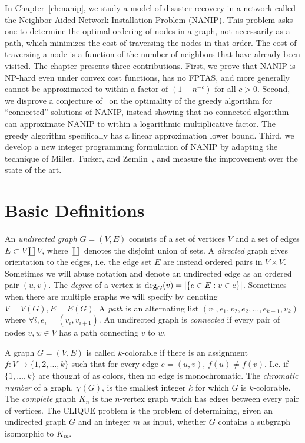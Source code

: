 In Chapter~\ref{ch:nanip}, we study a model of disaster recovery in a network
called the Neighbor Aided Network Installation Problem (NANIP). This problem
asks one to determine the optimal ordering of nodes in a graph, not necessarily
as a path, which minimizes the cost of traversing the nodes in that order. The
cost of traversing a node is a function of the number of neighbors that have
already been visited. The chapter presents three contributions. First, we prove
that NANIP is NP-hard even under convex cost functions, has no FPTAS, and more
generally cannot be approximated to within a factor of $(1-n^{-c})$ for all
$c>0$. Second, we disprove a conjecture of~\cite{Gutfraind14} on the optimality
of the greedy algorithm for ``connected'' solutions of NANIP, instead showing
that no connected algorithm can approximate NANIP to within a logarithmic
multiplicative factor. The greedy algorithm specifically has a linear
approximation lower bound. Third, we develop a new integer programming
formulation of NANIP by adapting the technique of Miller, Tucker, and
Zemlin~\cite{miller1960integer}, and measure the improvement over the state of
the art.~\cite{Gutfraind14}
 
\section{Basic Definitions}

An \emph{undirected graph} $G = (V,E)$ consists of a set of vertices $V$ and a
set of edges $E \subset V \coprod V$, where $\coprod$ denotes the disjoint
union of sets. A \emph{directed} graph gives orientation to the edges, i.e. the
edge set $E$ are instead ordered pairs in $V \times V$. Sometimes we will abuse
notation and denote an undirected edge as an ordered pair $(u,v)$. The
\emph{degree} of a vertex is $\textup{deg}_G(v) = |\{e \in E : v \in e \}|$.
Sometimes when there are multiple graphs we will specify by denoting $V = V(G),
E = E(G)$. A \emph{path} is an alternating list $(v_1, e_1, v_2, e_2, \dots,
e_{k-1}, v_k)$ where $\forall i, e_i = (v_i,v_{i+1})$. An undirected graph is
\emph{connected} if every pair of nodes $v,w \in V$ has a path connecting $v$
to $w$.

A graph $G = (V,E)$ is called $k$-colorable if there is an assignment $f:V \to \{
1, 2, \dots, k \}$ such that for every edge $e = (u,v)$, $f(u) \neq f(v)$. I.e.
if $\{1,\dots, k\}$ are thought of as colors, then no edge is monochromatic.
The \emph{chromatic number} of a graph, $\chi(G)$, is the smallest integer $k$
for which $G$ is $k$-colorable. The \emph{complete} graph $K_n$ is the
$n$-vertex graph which has edges between every pair of vertices. The CLIQUE
problem is the problem of determining, given an undirected graph $G$ and an
integer $m$ as input, whether $G$ contains a subgraph isomorphic to $K_m$.

